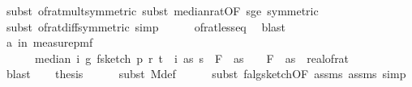 \begin{isabellebody}
\ {\isacharparenleft}{\kern0pt}subst\ of{\isacharunderscore}{\kern0pt}rat{\isacharunderscore}{\kern0pt}mult{\isacharbrackleft}{\kern0pt}symmetric{\isacharbrackright}{\kern0pt}{\isacharcomma}{\kern0pt}\ subst\ median{\isacharunderscore}{\kern0pt}rat{\isacharbrackleft}{\kern0pt}OF\ s{\isacharunderscore}{\kern0pt}ge{\isacharunderscore}{\kern0pt}{}{\isacharcomma}{\kern0pt}\ symmetric{\isacharbrackright}{\kern0pt}{\isacharparenright}{\kern0pt}\isanewline
\ \ \ \ \isamarkupfalse%
\ {\isacharparenleft}{\kern0pt}subst\ of{\isacharunderscore}{\kern0pt}rat{\isacharunderscore}{\kern0pt}diff{\isacharbrackleft}{\kern0pt}symmetric{\isacharbrackright}{\kern0pt}{\isacharcomma}{\kern0pt}\ simp{\isacharparenright}{\kern0pt}\isanewline
\ \ \ \ \isamarkupfalse%
\ of{\isacharunderscore}{\kern0pt}rat{\isacharunderscore}{\kern0pt}less{\isacharunderscore}{\kern0pt}eq\ \isamarkupfalse%
\ blast\isanewline
\ \ \isamarkupfalse%
\ \isamarkupfalse%
\ a{\isacharcolon}{\kern0pt}{\isachardoublequoteopen}{\isasymP}{\isacharparenleft}{\kern0pt}{\isasymomega}\ in\ measure{\isacharunderscore}{\kern0pt}pmf\ {\isasymOmega}\ \ \isanewline
\ \ \ \ \ \ {\isasymbar}median\ {\isacharparenleft}{\kern0pt}{\isasymlambda}i{\isachardot}{\kern0pt}\ g\ {\isacharparenleft}{\kern0pt}f{}{\isacharunderscore}{\kern0pt}sketch\ p\ r\ t\ {\isacharparenleft}{\kern0pt}{\isasymomega}\ i{\isacharparenright}{\kern0pt}\ as{\isacharparenright}{\kern0pt}{\isacharparenright}{\kern0pt}\ s\ {\isacharminus}{\kern0pt}\ F\ {}\ as{\isasymbar}\ {\isasymle}\ {\isasymdelta}\ {\isacharasterisk}{\kern0pt}\ F\ {}\ as{\isacharparenright}{\kern0pt}\ {\isasymge}\ {}{\isacharminus}{\kern0pt}real{\isacharunderscore}{\kern0pt}of{\isacharunderscore}{\kern0pt}rat\ {\isasymepsilon}{\isachardoublequoteclose}\isanewline
\ \ \ \ \isamarkupfalse%
\ blast\isanewline
\isanewline
\ \ \isamarkupfalse%
\ {\isacharquery}{\kern0pt}thesis\isanewline
\ \ \ \ \isamarkupfalse%
\ {\isacharparenleft}{\kern0pt}subst\ M{\isacharunderscore}{\kern0pt}def{\isacharparenright}{\kern0pt}\isanewline
\ \ \ \ \isamarkupfalse%
\ {\isacharparenleft}{\kern0pt}subst\ f{}{\isacharunderscore}{\kern0pt}alg{\isacharunderscore}{\kern0pt}sketch{\isacharbrackleft}{\kern0pt}OF\ assms{\isacharparenleft}{\kern0pt}{}{\isacharparenright}{\kern0pt}\ assms{\isacharparenleft}{\kern0pt}{}{\isacharparenright}{\kern0pt}{\isacharbrackright}{\kern0pt}{\isacharcomma}{\kern0pt}\ simp{\isacharparenright}{\kern0pt}\isanewline

\end{isabellebody}
